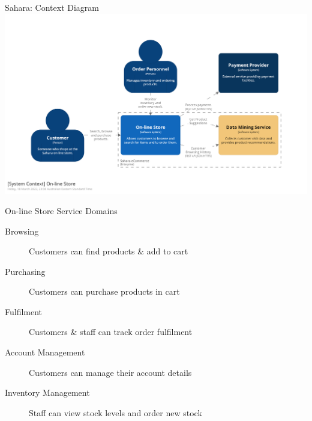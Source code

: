 \documentclass{slide}
\begin{document}
\begin{frame}{Sahara: Context Diagram}
    \centering
    \includegraphics[trim=195 195 195 195,clip,width=\textwidth]{diagrams/sahara-context.png}
\end{frame}

\begin{frame}{On-line Store Service Domains}
    \vspace{1mm}
    {\LARGE
    \begin{description}
        \item[Browsing] Customers can find products \& add to cart
        \item[Purchasing] Customers can purchase products in cart
        \item[Fulfilment] Customers \& staff can track order fulfilment
        \item[Account Management] Customers can manage their account details
        \item[Inventory Management] Staff can view stock levels and order new stock
    \end{description}
    }
\end{frame}
\end{document}
